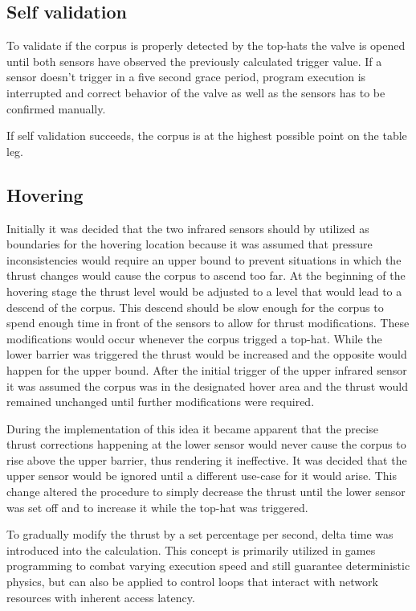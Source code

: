 \subsection{Self validation}
To validate if the corpus is properly detected by the top-hats the valve is opened until both sensors have observed the previously calculated trigger value. If a sensor doesn't trigger in a five second grace period, program execution is interrupted and correct behavior of the valve as well as the sensors has to be confirmed manually.

If self validation succeeds, the corpus is at the highest possible point on the table leg.

\subsection{Hovering}
Initially it was decided that the two infrared sensors should by utilized as boundaries for the hovering location because it was assumed that pressure inconsistencies would require an upper bound to prevent situations in which the thrust changes would cause the corpus to ascend too far. 
At the beginning of the hovering stage the thrust level would be adjusted to a level that would lead to a descend of the corpus. This descend should be slow enough for the corpus to spend enough time in front of the sensors to allow for thrust modifications.
These modifications would occur whenever the corpus trigged a top-hat. While the lower barrier was triggered the thrust would be increased and the opposite would happen for the upper bound. After the initial trigger of the upper infrared sensor it was assumed the corpus was in the designated hover area and the thrust would remained unchanged until further modifications were required.

During the implementation of this idea it became apparent that the precise thrust corrections happening at the lower sensor would never cause the corpus to rise above the upper barrier, thus rendering it ineffective. It was decided that the upper sensor would be ignored until a different use-case for it would arise. This change altered the procedure to simply decrease the thrust until the lower sensor was set off and to increase it while the top-hat was triggered.

To gradually modify the thrust by a set percentage per second, delta time was introduced into the calculation. This concept is primarily utilized in games \cite{delta-time} programming to combat varying execution speed and still guarantee deterministic physics, but can also be applied to control loops that interact with network resources with inherent access latency.  

